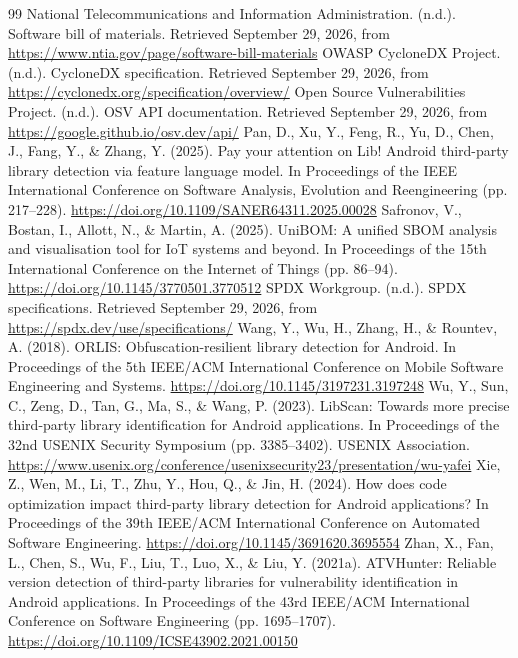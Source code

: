 \documentclass[10pt,twocolumn]{article}
\begin{document}
\begin{thebibliography}{99}
 National Telecommunications and Information Administration. (n.d.). Software bill of materials. Retrieved September 29, 2026, from \url{https://www.ntia.gov/page/software-bill-materials}
 OWASP CycloneDX Project. (n.d.). CycloneDX specification. Retrieved September 29, 2026, from \url{https://cyclonedx.org/specification/overview/}
 Open Source Vulnerabilities Project. (n.d.). OSV API documentation. Retrieved September 29, 2026, from \url{https://google.github.io/osv.dev/api/}
 Pan, D., Xu, Y., Feng, R., Yu, D., Chen, J., Fang, Y., \& Zhang, Y. (2025). Pay your attention on Lib! Android third-party library detection via feature language model. In Proceedings of the IEEE International Conference on Software Analysis, Evolution and Reengineering (pp. 217–228). \url{https://doi.org/10.1109/SANER64311.2025.00028}
 Safronov, V., Bostan, I., Allott, N., \& Martin, A. (2025). UniBOM: A unified SBOM analysis and visualisation tool for IoT systems and beyond. In Proceedings of the 15th International Conference on the Internet of Things (pp. 86–94). \url{https://doi.org/10.1145/3770501.3770512}
 SPDX Workgroup. (n.d.). SPDX specifications. Retrieved September 29, 2026, from \url{https://spdx.dev/use/specifications/}
 Wang, Y., Wu, H., Zhang, H., \& Rountev, A. (2018). ORLIS: Obfuscation-resilient library detection for Android. In Proceedings of the 5th IEEE/ACM International Conference on Mobile Software Engineering and Systems. \url{https://doi.org/10.1145/3197231.3197248}
 Wu, Y., Sun, C., Zeng, D., Tan, G., Ma, S., \& Wang, P. (2023). LibScan: Towards more precise third-party library identification for Android applications. In Proceedings of the 32nd USENIX Security Symposium (pp. 3385–3402). USENIX Association. \url{https://www.usenix.org/conference/usenixsecurity23/presentation/wu-yafei}
 Xie, Z., Wen, M., Li, T., Zhu, Y., Hou, Q., \& Jin, H. (2024). How does code optimization impact third-party library detection for Android applications? In Proceedings of the 39th IEEE/ACM International Conference on Automated Software Engineering. \url{https://doi.org/10.1145/3691620.3695554}
 Zhan, X., Fan, L., Chen, S., Wu, F., Liu, T., Luo, X., \& Liu, Y. (2021a). ATVHunter: Reliable version detection of third-party libraries for vulnerability identification in Android applications. In Proceedings of the 43rd IEEE/ACM International Conference on Software Engineering (pp. 1695–1707). \url{https://doi.org/10.1109/ICSE43902.2021.00150}

\end{thebibliography}
\end{document}
